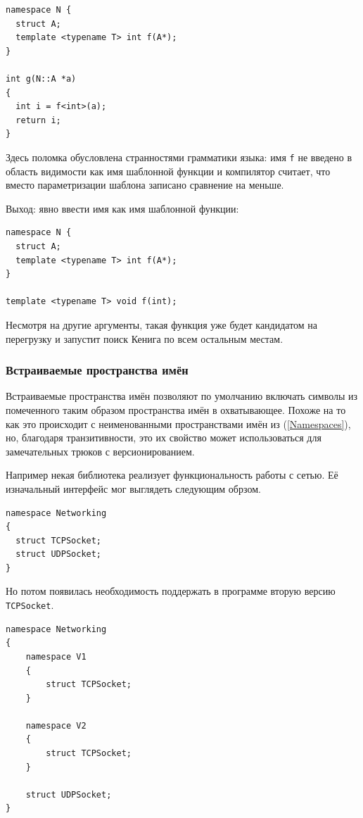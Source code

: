 \documentclass[a4paper,12pt,oneside]{article}
\begin{document}
\begin{lstlisting}
namespace N {
  struct A;
  template <typename T> int f(A*);
}

int g(N::A *a)
{
  int i = f<int>(a);
  return i;
}
\end{lstlisting}

Здесь поломка обусловлена странностями грамматики языка: имя \lstinline!f! не введено в область видимости как имя шаблонной функции и компилятор считает, что вместо параметризации шаблона записано сравнение на меньше.

Выход: явно ввести имя как имя шаблонной функции:

\begin{lstlisting}
namespace N {
  struct A;
  template <typename T> int f(A*);
}

template <typename T> void f(int);
\end{lstlisting}

Несмотря на другие аргументы, такая функция уже будет кандидатом на перегрузку и запустит поиск Кенига по всем остальным местам.

\subsubsection{Встраиваемые пространства имён}\label{InlineNameSpaces}

Встраиваемые пространства имён позволяют по умолчанию включать символы из помеченного таким образом пространства имён в охватывающее. Похоже на то как это происходит с неименованными пространствами имён из (\ref{Namespaces}), но, благодаря транзитивности, это их свойство может использоваться для замечательных трюков с версионированием.

Например некая библиотека реализует функциональность работы с сетью. Её изначальный интерфейс мог выглядеть следующим обрзом.

\begin{lstlisting}
namespace Networking 
{
  struct TCPSocket;
  struct UDPSocket;
}
\end{lstlisting}

Но потом появилась необходимость поддержать в программе вторую версию \lstinline!TCPSocket!.

\begin{lstlisting}
namespace Networking 
{
    namespace V1 
    {
        struct TCPSocket;
    }
     
    namespace V2 
    {
        struct TCPSocket;
    }
 
    struct UDPSocket;
}
\end{lstlisting}
\end{document}
